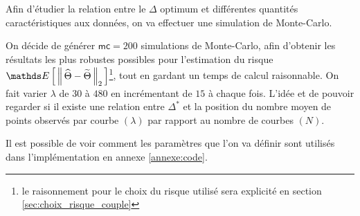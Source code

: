 
Afin d'étudier la relation entre le $\Delta$ optimum et différentes quantités caractéristiques aux données, on va effectuer une simulation de Monte-Carlo.

On décide de générer $\mathsf{mc} = 200$ simulations de Monte-Carlo, afin d'obtenir les résultats les plus robustes possibles pour l'estimation du risque $\esperance{\distnorme 2 {\widehat \Theta} {\widetilde \Theta}}$\footnote{le raisonnement pour le choix du risque utilisé sera explicité en section \ref{sec:choix_risque_couple}}, tout en gardant un temps de calcul raisonnable. On fait varier $\lambda$ de $30$ à $480$ en incrémentant de $15$ à chaque fois. L'idée et de pouvoir regarder si il existe une relation entre $\Delta^*$ et la position du nombre moyen de points observés par courbe $(\lambda)$ par rapport au nombre de courbes $(N)$.

\smallskip

\noindent Il est possible de voir comment les paramètres que l'on va définir sont utilisés dans l'implémentation en annexe \ref{annexe:code}.


\newcommand{\tlnm}{T^{[\lambda]}_{n}[m]}
\newcommand{\mset}{\llbracket 1, M_n \rrbracket}
\newcommand{\nset}{\llbracket 1, N \rrbracket}
\newcommand{\lbdset}{\llbracket 30, 45, \dots , 480 \rrbracket}
\newcommand{\genxset}{\bigl(\tlnm, X_n(\tlnm)\bigr)_{m \in \mset}}
\newcommand{\simset}{\left\{ \genxset \, : \, n \in \nset, \, \lambda \& N \textsf{ fixés } \right\}}
\newcommand{\simsetall}{\left\{ \genxset \, : \, N \in \overrightarrow N, \, \lambda \in \lbdset, \, n \in \nset \right\}}
